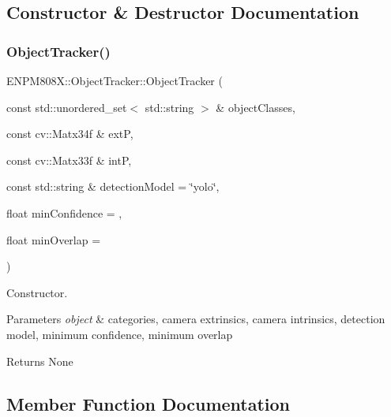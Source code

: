 \subsection{Constructor \& Destructor Documentation}
\mbox{\label{class_e_n_p_m808_x_1_1_object_tracker_a457dcaca4e26ff55678ac2f2d727f322}} 
\subsubsection{\texorpdfstring{Object\+Tracker()}{ObjectTracker()}}
{\footnotesize\ttfamily E\+N\+P\+M808\+X\+::\+Object\+Tracker\+::\+Object\+Tracker (\begin{DoxyParamCaption}\item[{const std\+::unordered\+\_\+set$<$ std\+::string $>$ \&}]{object\+Classes,  }\item[{const cv\+::\+Matx34f \&}]{extP,  }\item[{const cv\+::\+Matx33f \&}]{intP,  }\item[{const std\+::string \&}]{detection\+Model = {\ttfamily \char`\"{}yolo\char`\"{}},  }\item[{float}]{min\+Confidence = {},  }\item[{float}]{min\+Overlap = {} }\end{DoxyParamCaption})}



Constructor. 


\begin{DoxyParams}{Parameters}
{\em object} & categories, camera extrinsics, camera intrinsics, detection model, minimum confidence, minimum overlap \\
\hline
\end{DoxyParams}
\begin{DoxyReturn}{Returns}
None 
\end{DoxyReturn}


\subsection{Member Function Documentation}
\mbox{\label{class_e_n_p_m808_x_1_1_object_tracker_abec22b27cb028cf5911b4198970f3c57}} 
